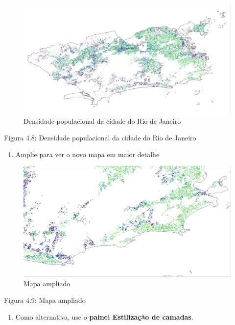 \documentclass[
]{krantz}
\providecommand{\tightlist}{%
  \setlength{\itemsep}{0pt}\setlength{\parskip}{0pt}}
\begin{document}
\begin{figure}
\centering
\includegraphics{media/modulo4/hrsl-style.png}
\caption{Densidade populacional da cidade do Rio de Janeiro}
\end{figure}

Figura 4.8: Densidade populacional da cidade do Rio de Janeiro

\begin{enumerate}
\def\labelenumi{\arabic{enumi}.}
\setcounter{enumi}{4}
\tightlist
\item
  Amplie para ver o novo mapa em maior detalhe
\end{enumerate}

\begin{figure}
\centering
\includegraphics{media/modulo4/zoom-in.png}
\caption{Mapa ampliado}
\end{figure}

Figura 4.9: Mapa ampliado

\begin{enumerate}
\def\labelenumi{\arabic{enumi}.}
\setcounter{enumi}{5}
\tightlist
\item
  Como alternativa, use o \textbf{painel Estilização de camadas}.
\end{enumerate}
\end{document}

